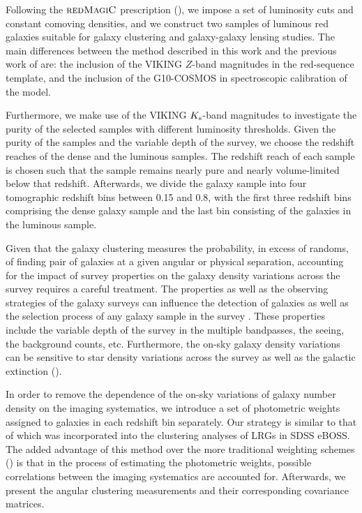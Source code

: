 \documentclass[fleqn,usenatbib,useAMS]{mnras}
\begin{document}
Following the $\textsc{redMagiC}$ prescription (\citealt{rozo2016}), we impose a set of luminosity cuts and constant comoving densities, and we construct two samples of luminous red galaxies suitable for galaxy clustering and galaxy-galaxy lensing studies. The main differences between the method described in this work and the previous work of \citet{vakili2019} are: the inclusion of the VIKING $Z$-band magnitudes in the red-sequence template, and the inclusion of the G10-COSMOS in spectroscopic calibration of the model. %

Furthermore, we make use of the VIKING $K_{\rm s}$-band magnitudes to investigate the purity of the selected samples with different luminosity thresholds. Given the purity of the samples and the variable depth of the survey, we choose the redshift reaches of the dense and the luminous samples. The redshift reach of each sample is chosen such that the sample remains nearly pure and nearly volume-limited below that redshift. Afterwards, we divide the galaxy sample into four tomographic redshift bins between 0.15 and 0.8, with the first three redshift bins comprising the dense galaxy sample and the last bin consisting of the galaxies in the luminous sample. 

Given that the galaxy clustering measures the probability, in excess of randoms, of finding pair of galaxies at a given angular or physical separation, accounting for the impact of survey properties on the galaxy density variations across the survey requires a careful treatment. The properties as well as the observing strategies of the galaxy surveys can influence the detection of galaxies as well as the selection process of any galaxy sample in the survey \citep[e.g.][]{alam2017,kwan2017,ross2017,elvin2017,crocce2019,kalus2019}. These properties include the variable depth of the survey in the multiple bandpasses, the seeing, the background counts, etc. Furthermore, the on-sky galaxy density variations can be sensitive to star density variations across the survey as well as the galactic extinction (\citealt{leistedt2014, ignacio2018, crocce2019dark, rezaie2019}). 

In order to remove the dependence of the on-sky variations of galaxy number density on the imaging systematics, we introduce a set of photometric weights assigned to galaxies in each redshift bin separately. Our strategy is similar to that of \citet{bautista2018sdss, icaza2020clustering} which was incorporated into the clustering analyses of LRGs in SDSS eBOSS. The added advantage of this method over the more traditional weighting schemes (\citealt{ross2017clustering, crocce2019dark}) is that in the process of estimating the photometric weights, possible correlations between the imaging systematics are accounted for. Afterwards, we present the angular clustering measurements and their corresponding covariance matrices.
\end{document}
